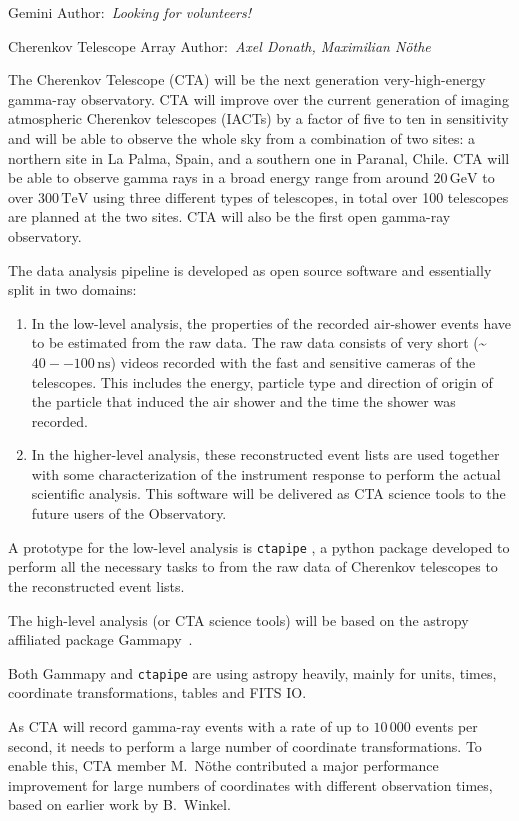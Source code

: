 \documentclass[modern]{aastex631}
\newcommand{\secauthor}[1]{{\color{blue}Author:~\textit{#1}}}
\newcommand{\secunfilled}{{\color{red}Author:~\textit{Looking for volunteers!}}}
\begin{document}
Gemini
\secunfilled

Cherenkov Telescope Array
\secauthor{Axel Donath, Maximilian Nöthe}

The Cherenkov Telescope (CTA) will be the next generation very-high-energy
gamma-ray observatory.
CTA will improve over the current generation of imaging atmospheric Cherenkov telescopes (IACTs)
by a factor of five to ten in sensitivity and will be able to observe the whole sky from a combination of two sites:
a northern site in La Palma, Spain, and a southern one in Paranal, Chile.
CTA will be able to observe gamma rays in a broad energy range from around $20\,\mathrm{GeV}$ to over $300\,\mathrm{TeV}$
using three different types of telescopes, in total over 100 telescopes are planned at the two sites.
CTA will also be the first open gamma-ray observatory.

The data analysis pipeline is developed as open source software and essentially split in two domains:
\begin{enumerate}
  \item In the low-level analysis, the properties of the recorded air-shower events
    have to be estimated from the raw data.
    The raw data consists of very short (\textasciitilde $40--100\,\mathrm{ns}$) videos recorded with the fast and
    sensitive cameras of the telescopes.
    This includes the energy, particle type and direction of origin of the particle that induced the air shower
    and the time the shower was recorded.
  \item In the higher-level analysis, these reconstructed event lists are used together with some
    characterization of the instrument response to perform the actual scientific analysis.
    This software will be delivered as CTA science tools to the future users of the Observatory.
\end{enumerate}

A prototype for the low-level analysis is \texttt{ctapipe} \citep{ctapipe},
a python package developed to perform all the necessary tasks to from the raw data
of Cherenkov telescopes to the reconstructed event lists.

The high-level analysis (or CTA science tools) will be based on the astropy affiliated package
Gammapy~\citep{gammapy}.

Both Gammapy and \texttt{ctapipe} are using astropy heavily, mainly for units, times, coordinate transformations,
tables and FITS IO.

As CTA will record gamma-ray events with a rate of up to $10\,000$ events per second,
it needs to perform a large number of coordinate transformations.
To enable this, CTA member M.~Nöthe contributed a major performance improvement
for large numbers of coordinates with different observation times,
based on earlier work by B.~Winkel.
\end{document}
